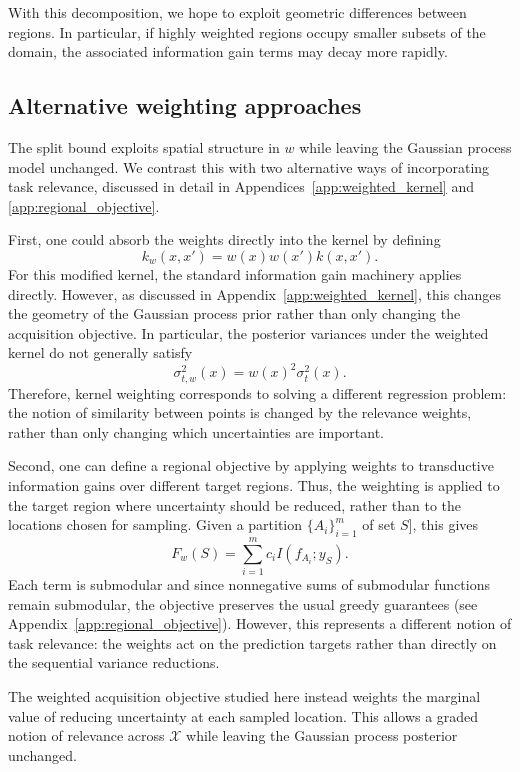 With this decomposition, we hope to exploit geometric differences between regions. In particular, if highly weighted regions occupy smaller subsets of the domain, the associated information gain terms may decay more rapidly.

\subsection{Alternative weighting approaches}

The split bound exploits spatial structure in $w$ while leaving the
Gaussian process model unchanged. We contrast this with two alternative
ways of incorporating task relevance, discussed in detail in
Appendices~\ref{app:weighted_kernel} and
\ref{app:regional_objective}.

First, one could absorb the weights directly into the kernel by defining
$$
k_w(x,x')
=
w(x)w(x')k(x,x').
$$
For this modified kernel, the standard information gain machinery applies
directly. However, as discussed in Appendix~\ref{app:weighted_kernel}, this
changes the geometry of the Gaussian process prior rather than only changing
the acquisition objective. In particular, the posterior variances under the
weighted kernel do not generally satisfy
$$
\sigma_{t,w}^2(x)
=
w(x)^2\sigma_t^2(x).
$$
Therefore, kernel weighting corresponds to solving a different regression
problem: the notion of similarity between points is changed by the relevance
weights, rather than only changing which uncertainties are important.

Second, one can define a regional objective by applying weights to
transductive information gains over different target regions. Thus, the weighting is applied to the target region where uncertainty should be
reduced, rather than to the locations chosen for sampling. Given a
partition $\{A_i\}_{i=1}^m$ of set $S$], this gives
\[
F_w(S)
=
\sum_{i=1}^m c_i I(f_{A_i};y_S).
\]
Each term is submodular  and since nonnegative
sums of submodular functions remain submodular, the objective preserves
the usual greedy guarantees (see Appendix~\ref{app:regional_objective}).
However, this represents a different notion of task relevance: the
weights act on the prediction targets rather than directly on the
sequential variance reductions. 

The weighted acquisition objective studied here instead weights the marginal
value of reducing uncertainty at each sampled location. This allows a
graded notion of relevance across $\mathcal X$ while leaving the Gaussian
process posterior unchanged.
